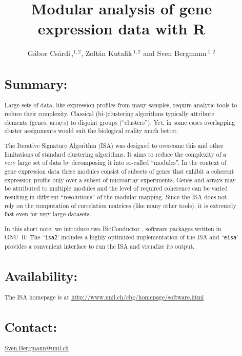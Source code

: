\documentclass{bioinfo}
\newcommand{\Rpackage}[1]{`\texttt{#1}'}
\begin{document}

\title[Modular analysis]{Modular analysis of gene expression data with R}
\author[G\'abor Cs\'ardi \textit{et~al}]{G\'abor Cs\'ardi\,,$^{1,2}$,
  Zolt\'an Kutalik\,$^{1,2}$ and Sven Bergmann\,$^{1,2}$}
\address{$^{1}$Department of Medical Genetics, and
  $^{2}$Swiss Institute of Bioinformatics,
  University of Lausanne, Rue de Bugnon 27, CH-1005 Lausanne,
  Switzerland.}



\maketitle

\begin{abstract}
\section{Summary:}
Large sets of data, like expression profiles from many samples, require
analytic tools to reduce their complexity. Classical (bi-)clustering
algorithms typically attribute elements (genes, arrays) to disjoint groups
(``clusters''). Yet, in some cases overlapping cluster assignments would suit
the biological reality much better.

The Iterative Signature Algorithm (ISA) was designed to overcome this and
other limitations of standard clustering algorithms. It aims to reduce the
complexity of a very large set of data by decomposing it into so-called
``modules''. In the context of gene expression data these modules consist of
subsets of genes that exhibit a coherent expression profile only over a
subset of microarray experiments. Genes and arrays may be attributed to
multiple modules and the level of required coherence can be varied resulting
in different ``resolutions'' of the modular mapping. Since the ISA does not
rely on the computation of correlation matrices (like many other tools), it
is extremely fast even for very large datasets.

In this short note, we introduce two BioConductor \citep{BioC}, software
packages written in GNU~R: The~\Rpackage{isa2} includes a highly optimized
implementation of the ISA and~\Rpackage{eisa} provides a convenient interface
to run the ISA and visualize its output.

\section{Availability:}
The ISA homepage is at \href{http://www.unil.ch/cbg/homepage/software.html}%
{\url{http://www.unil.ch/cbg/homepage/software.html}}
\section{Contact:} \href{Sven.Bergmann@unil.ch}{Sven.Bergmann@unil.ch}
\end{abstract}
\end{document}
